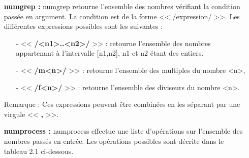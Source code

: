 \begin{itemize}
 \item[\textbullet] \textbf{numgrep :} numgrep retourne l'ensemble des nombres v\'erifiant la condition pass\'ee en argument. La condition est de la
forme << /expression/ >>. Les diff\'erentes expressions possibles sont les suivantes :
  \begin{itemize}
  \item[-] << \textbf{/<n1>..<n2>/} >> : retourne l'ensemble des nombres appartenant \`a l'intervalle [n1,n2], n1 et n2 \'etant des entiers.
  \item[-] << \textbf{/m<n>/} >> : retourne l'ensemble des multiples du nombre <n>,
  \item[-] << \textbf{/f<n>/} >> : retourne l'ensemble des diviseurs du nombre <n>.
  \end{itemize}
Remarque : Ces expressions peuvent \^etre combin\'ees en les s\'eparant par une virgule << \textbf{,} >>.
\newline
 \item[\textbullet] \textbf{numprocess :} numprocess effectue une liste d'op\'erations sur l'ensemble des nombres pass\'es en entr\'ee.
Les op\'erations possibles sont d\'ecrite dans le tableau 2.1 ci-dessous.
\begin{table}[h]
\begin{center}


\end{center}
\end{table}
\end{itemize}
